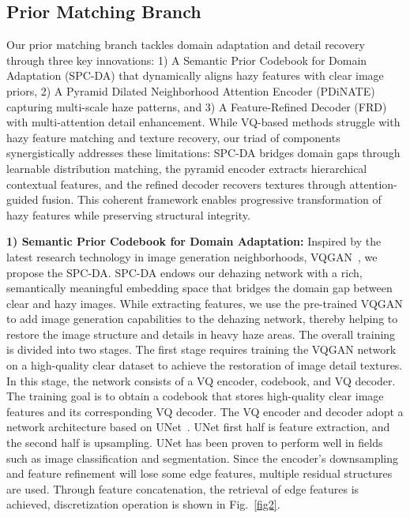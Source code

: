 \documentclass[journal]{IEEEtran}
\begin{document}
\subsection{Prior Matching Branch}
Our prior matching branch tackles domain adaptation and detail recovery through three key innovations: 1) A Semantic Prior Codebook for Domain Adaptation (SPC-DA) that dynamically aligns hazy features with clear image priors, 2) A Pyramid Dilated Neighborhood Attention Encoder (PDiNATE) capturing multi-scale haze patterns, and 3) A Feature-Refined Decoder (FRD) with multi-attention detail enhancement. While VQ-based methods struggle with hazy feature matching and texture recovery, our triad of components synergistically addresses these limitations: SPC-DA bridges domain gaps through learnable distribution matching, the pyramid encoder extracts hierarchical contextual features, and the refined decoder recovers textures through attention-guided fusion. This coherent framework enables progressive transformation of hazy features while preserving structural integrity.

	{\bf{1) Semantic Prior Codebook for Domain Adaptation:}} Inspired by the latest research technology in image generation neighborhoods, VQGAN~\cite{esser2021taming}, we propose the SPC-DA. SPC-DA endows our dehazing network with a rich, semantically meaningful embedding space that bridges the domain gap between clear and hazy images. While extracting features, we use the pre-trained VQGAN to add image generation capabilities to the dehazing network, thereby helping to restore the image structure and details in heavy haze areas. The overall training is divided into two stages. The first stage requires training the VQGAN network on a high-quality clear dataset to achieve the restoration of image detail textures. In this stage, the network consists of a VQ encoder, codebook, and VQ decoder. The training goal is to obtain a codebook that stores high-quality clear image features and its corresponding VQ decoder. The VQ encoder and decoder adopt a network architecture based on UNet~\cite{ronneberger2015u}. UNet first half is feature extraction, and the second half is upsampling. UNet has been proven to perform well in fields such as image classification and segmentation. Since the encoder's downsampling and feature refinement will lose some edge features, multiple residual structures are used. Through feature concatenation, the retrieval of edge features is achieved, discretization operation is shown in Fig.~\ref{fig2}.
\end{document}
